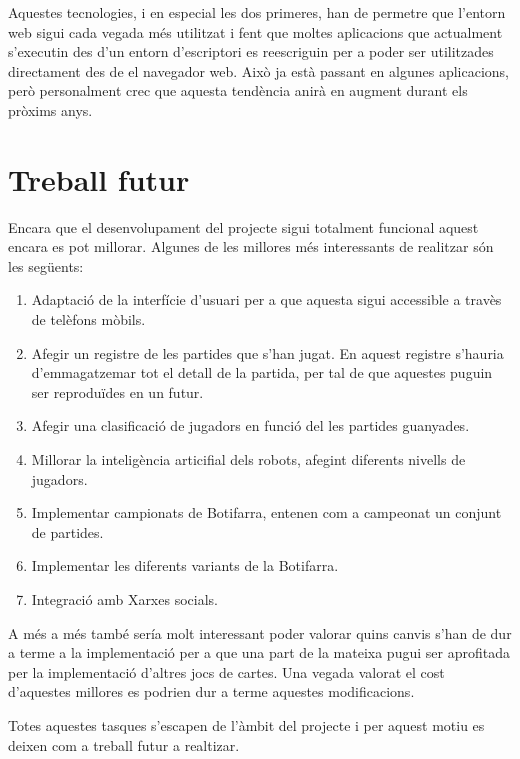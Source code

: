 Aquestes tecnologies, i en especial les dos primeres, han de permetre que l'entorn web sigui cada vegada més utilitzat i fent que moltes aplicacions que actualment s'executin des d'un entorn d'escriptori es reescriguin per a poder ser utilitzades directament des de el navegador web. Això ja està passant en algunes aplicacions, però personalment crec que aquesta tendència anirà en augment durant els pròxims anys. 

\section{Treball futur}

Encara que el desenvolupament del projecte sigui totalment funcional aquest encara es pot millorar. Algunes de les millores més interessants de realitzar són les següents: 

\begin{enumerate}
    \item{Adaptació de la interfície d'usuari per a que aquesta sigui accessible a travès de telèfons mòbils.}
    \item{Afegir un registre de les partides que s'han jugat. En aquest registre s'hauria d'emmagatzemar tot el detall de la partida, per tal de que aquestes puguin ser reproduïdes en un futur.}
    \item{Afegir una clasificació de jugadors en funció del les partides guanyades.}
    \item{Millorar la inteligència articifial dels robots, afegint diferents nivells de jugadors.}
    \item{Implementar campionats de Botifarra, entenen com a campeonat un conjunt de partides.}
    \item{Implementar les diferents variants de la Botifarra.}
    \item{Integració amb Xarxes socials.}
\end{enumerate}

A més a més també sería molt interessant poder valorar quins canvis s'han de dur a terme a la implementació per a que una part de la mateixa pugui ser aprofitada per la implementació d'altres jocs de cartes. Una vegada valorat el cost d'aquestes millores es podrien dur a terme aquestes modificacions.

Totes aquestes tasques s'escapen de l'àmbit del projecte i per aquest motiu es deixen com a treball futur a realtizar.
